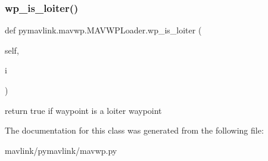 \subsubsection{\texorpdfstring{wp\+\_\+is\+\_\+loiter()}{wp\_is\_loiter()}}
{\footnotesize\ttfamily def pymavlink.\+mavwp.\+M\+A\+V\+W\+P\+Loader.\+wp\+\_\+is\+\_\+loiter (\begin{DoxyParamCaption}\item[{}]{self,  }\item[{}]{i }\end{DoxyParamCaption})}

\begin{DoxyVerb}return true if waypoint is a loiter waypoint\end{DoxyVerb}
 

The documentation for this class was generated from the following file\+:\begin{DoxyCompactItemize}
\item 
mavlink/pymavlink/mavwp.\+py\end{DoxyCompactItemize}
